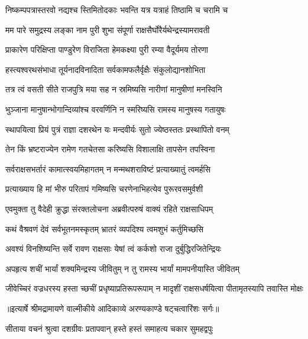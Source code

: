 \twolineshloka
{निष्कम्पपत्रास्तरवो नद्यश्च स्तिमितोदकाः}
{भवन्ति यत्र यत्राहं तिष्ठामि च चरामि च} %

\twolineshloka
{मम पारे समुद्रस्य लङ्का नाम पुरी शुभा}
{संपूर्णा राक्षसैर्घोरैर्यथेन्द्रस्यामरावती} %

\twolineshloka
{प्राकारेण परिक्षिप्ता पाण्डुरेण विराजिता}
{हेमकक्ष्या पुरी रम्या वैदूर्यमय तोरणा} %

\twolineshloka
{हस्त्यश्वरथसंभाधा तूर्यनादविनादिता}
{सर्वकामफलैर्वृक्षैः संकुलोद्यानशोभिता} %

\twolineshloka
{तत्र त्वं वसती सीते राजपुत्रि मया सह}
{न स्रमिष्यसि नारीणां मानुषीणां मनस्विनि} %

\twolineshloka
{भुञ्जाना मानुषान्भोगान्दिव्यांश्च वरवर्णिनि}
{न स्मरिष्यसि रामस्य मानुषस्य गतायुषः} %

\twolineshloka
{स्थापयित्वा प्रियं पुत्रं राज्ञा दशरथेन यः}
{मन्दवीर्यः सुतो ज्येष्ठस्ततः प्रस्थापितो वनम्} %

\twolineshloka
{तेन किं भ्रष्टराज्येन रामेण गतचेतसा}
{करिष्यसि विशालाक्षि तापसेन तपस्विना} %

\twolineshloka
{सर्वराक्षसभर्तारं कामात्स्वयमिहागतम्}
{न मन्मथशराविष्टं प्रत्याख्यातुं त्वमर्हसि} %

\twolineshloka
{प्रत्याख्याय हि मां भीरु परितापं गमिष्यसि}
{चरणेनाभिहत्येव पुरूरवसमुर्वशी} %

\twolineshloka
{एवमुक्ता तु वैदेही क्रुद्धा संरक्तलोचना}
{अब्रवीत्परुषं वाक्यं रहिते राक्षसाधिपम्} %

\twolineshloka
{कथं वैश्रवणं देवं सर्वभूतनमस्कृतम्}
{भ्रातरं व्यपदिश्य त्वमशुभं कर्तुमिच्छसि} %

\twolineshloka
{अवश्यं विनशिष्यन्ति सर्वे रावण राक्षसाः}
{येषां त्वं कर्कशो राजा दुर्बुद्धिरजितेन्द्रियः} %

\twolineshloka
{अपहृत्य शचीं भार्यां शक्यमिन्द्रस्य जीवितुम्}
{न तु रामस्य भार्यां मामपनीयास्ति जीवितम्} %

\fourlineindentedshloka
{जीवेच्चिरं वज्रधरस्य हस्ता}
{च्छचीं प्रधृष्याप्रतिरूपरूपाम्}
{न मादृशीं राक्षसधर्षयित्वा}
{ पीतामृतस्यापि तवास्ति मोक्षः} %


{॥इत्यार्षे श्रीमद्रामायणे वाल्मीकीये आदिकाव्ये अरण्यकाण्डे षट्चत्वारिंशः सर्गः॥}


\twolineshloka
{सीताया वचनं श्रुत्वा दशग्रीवः प्रतापवान्}
{हस्ते हस्तं समाहत्य चकार सुमहद्वपुः} %

